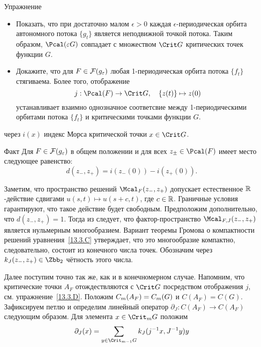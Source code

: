 \begin{ex}{Упражнение}\label{13.3.D}
  \begin{itemize}
  \item
    Показать, что при достаточно малом $\epsilon > 0$ каждая
    $\epsilon$-пе\-ри\-оди\-чес\-кая орбита автономного потока $\{g_{t}\}$
    является неподвижной точкой потока. Таким образом, $\Pcal(\epsilon
    G)$ совпадает с множеством $\Crit G$ критических точек функции $G$.
  \item
    Докажите, что для $F\in\mathcal{F}(g_{\varepsilon})$ любая 1-периодическая
    орбита потока $\{f_{t}\}$ стягиваема. 
    Более того, отображение\?{}{+ $\{\}$}
    \[
    j : \Pcal(F)\to\Crit G,
    \quad
    \{z(t)\}\mapsto z(0)
    \]
    устанавливает взаимно однозначное соответсвие между
    1-пе\-ри\-оди\-чес\-кими орбитами потока $\{f_{t}\}$ и критическими
    точками функции $G$.
  \end{itemize}
\end{ex}

 через $i(x)$ индекс Морса критической точки $x\in\Crit G$.

\begin{thm}{Факт}\label{13.3.E}
  Для $F\in\mathcal{F}(g_{\varepsilon})$ в общем положении и для всех
  $z_{\pm}\in\Pcal(F)$ имеет место следующее равенство:
  \[
  d(z_{-}, z_{+}) = i(z_{-}(0)) - i(z_{+}(0)).
  \]
\end{thm}

Заметим, что пространство решений $\Mcal_{F}(z_{-},z_{+})$ допускает
естественное $\mathbb{R}$-действие сдвигами $u(s, t)\mapsto u(s+c, t)$, где
$c\in\mathbb{R}$.
Граничные условия гарантируют, что такое действие будет свободным.
Предположим дополнительно, что $d(z_{-}, z_{+}) = 1$.
Тогда из  следует, что
фактор-пространство $\Mcal_{F,J}(z_{-},z_{+})$ является нульмерным
многообразием.
Вариант теоремы Громова о компактности решений
уравнения~\ref{13.3.C} утверждает, что это многообразие компактно,
следовательно, состоит из конечного числа точек.
Обозначим через $k_{J}(z_{-},z_{+})\in\Zbb_{2}$ чётность этого числа.

Далее поступим точно так же, как и в конечномерном случае.
Напомним, что критические точки $A_{F}$ отождествляются с $\Crit G$ посредством отображения $j$, см. упражнение~\ref{13.3.D}.
Положим $C_{m}(A_{F}) \z= C_{m}(G)$ и $C(A_{F}) = C(G)$.
Зафиксируем петлю  и определим линейный оператор
$\partial_{J}:C(A_{F})\to C(A_{F})$ следующим образом.
Для элемента $x\in\Crit_{m} G$ положим
\[
\partial_{J}(x)=\sum_{y\in\Crit_{m-1}G}k_{J}(j^{-1}x,J^{-1}y)y
\]


